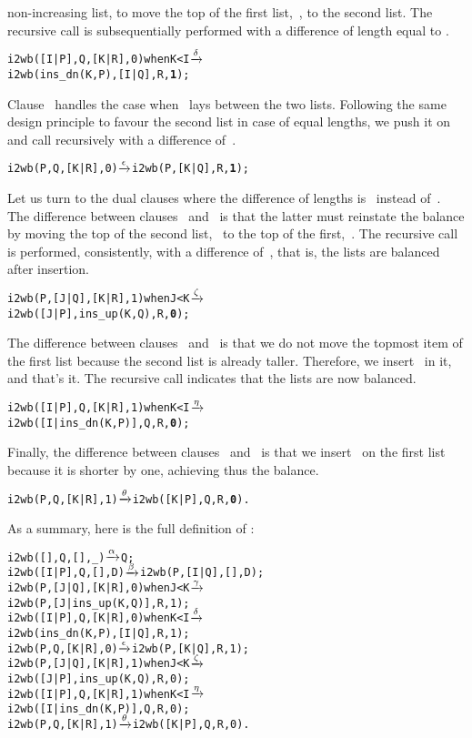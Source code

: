non\hyp{}increasing list, to move the top of the first
list,~, to the second list. The recursive call is
subsequentially performed with a difference of length equal to
.
\begin{alltt}
i2wb([I|P],Q,[K|R],0) when K < I \(\smashedrightarrow{\delta}\)
\hfill i2wb(ins_dn(K,P),[I|Q],R,\textbf{1});
\end{alltt}
Clause~\clause{\epsilon} handles the case when~ lays
between the two lists. Following the same design principle to favour
the second list in case of equal lengths, we push it on~
and call recursively with a difference of~.
\begin{alltt}
i2wb(P,Q,[K|R],0) \(\smashedrightarrow{\epsilon}\) i2wb(P,[K|Q],R,\textbf{1});
\end{alltt}
Let us turn to the dual clauses where the difference of lengths
is~ instead of~. The difference between clauses
\clause{\gamma}~and~\clause{\zeta} is that the latter must reinstate
the balance by moving the top of the second list, ~to the
top of the first,~. The recursive call is performed,
consistently, with a difference of~, that is, the lists are
balanced after insertion.
\begin{alltt}
i2wb(P,[J|Q],[K|R],1) when J < K \(\smashedrightarrow{\zeta}\)
\hfill i2wb([J|P],ins_up(K,Q),R,\textbf{0});
\end{alltt}
The difference between clauses \clause{\delta}~and~\clause{\eta} is
that we do not move the topmost item of the first list because the
second list is already taller. Therefore, we insert~ in it,
and that's it. The recursive call indicates that the lists are now
balanced.
\begin{alltt}
i2wb([I|P],Q,[K|R],1) when K < I \(\smashedrightarrow{\eta}\)
\hfill i2wb([I|ins_dn(K,P)],Q,R,\textbf{0});
\end{alltt}
Finally, the difference between clauses
\clause{\epsilon}~and~\clause{\theta} is that we insert~ on
the first list because it is shorter by one, achieving thus the
balance.
\begin{alltt}
i2wb(P,Q,[K|R],1) \(\smashedrightarrow{\theta}\) i2wb([K|P],Q,R,\textbf{0}).
\end{alltt}
As a summary, here is the full definition of
\label{code:i2wb}:
\begin{alltt}
i2wb(   [],    Q,   [],_)            \(\smashedrightarrow{\alpha}\) Q;
i2wb([I|P],    Q,   [],D)            \(\smashedrightarrow{\beta}\) i2wb(P,[I|Q],[],D);
i2wb(    P,[J|Q],[K|R],0) when J < K \(\smashedrightarrow{\gamma}\)
\hfill i2wb(P,[J|ins_up(K,Q)],R,1);
i2wb([I|P],    Q,[K|R],0) when K < I \(\smashedrightarrow{\delta}\)
\hfill i2wb(ins_dn(K,P),[I|Q],R,1);
i2wb(    P,    Q,[K|R],0)            \(\smashedrightarrow{\epsilon}\) i2wb(P,[K|Q],R,1);
i2wb(    P,[J|Q],[K|R],1) when J < K \(\smashedrightarrow{\zeta}\)
\hfill i2wb([J|P],ins_up(K,Q),R,0);
i2wb([I|P],    Q,[K|R],1) when K < I \(\smashedrightarrow{\eta}\)
\hfill i2wb([I|ins_dn(K,P)],Q,R,0);
i2wb(    P,    Q,[K|R],1)            \(\smashedrightarrow{\theta}\) i2wb([K|P],Q,R,0).
\end{alltt}
